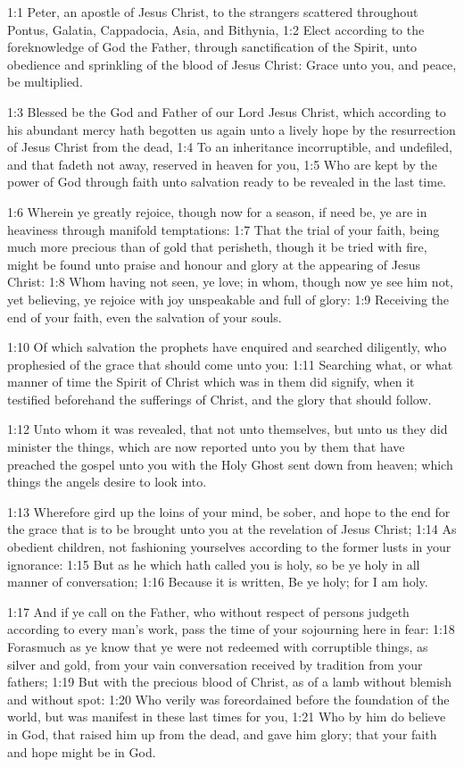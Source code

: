 

1:1 Peter, an apostle of Jesus Christ, to the strangers scattered throughout Pontus, Galatia, Cappadocia, Asia, and Bithynia, 1:2 Elect according to the foreknowledge of God the Father, through sanctification of the Spirit, unto obedience and sprinkling of the blood of Jesus Christ: Grace unto you, and peace, be multiplied.

1:3 Blessed be the God and Father of our Lord Jesus Christ, which according to his abundant mercy hath begotten us again unto a lively hope by the resurrection of Jesus Christ from the dead, 1:4 To an inheritance incorruptible, and undefiled, and that fadeth not away, reserved in heaven for you, 1:5 Who are kept by the power of God through faith unto salvation ready to be revealed in the last time.

1:6 Wherein ye greatly rejoice, though now for a season, if need be, ye are in heaviness through manifold temptations: 1:7 That the trial of your faith, being much more precious than of gold that perisheth, though it be tried with fire, might be found unto praise and honour and glory at the appearing of Jesus Christ: 1:8 Whom having not seen, ye love; in whom, though now ye see him not, yet believing, ye rejoice with joy unspeakable and full of glory: 1:9 Receiving the end of your faith, even the salvation of your souls.

1:10 Of which salvation the prophets have enquired and searched diligently, who prophesied of the grace that should come unto you: 1:11 Searching what, or what manner of time the Spirit of Christ which was in them did signify, when it testified beforehand the sufferings of Christ, and the glory that should follow.

1:12 Unto whom it was revealed, that not unto themselves, but unto us they did minister the things, which are now reported unto you by them that have preached the gospel unto you with the Holy Ghost sent down from heaven; which things the angels desire to look into.

1:13 Wherefore gird up the loins of your mind, be sober, and hope to the end for the grace that is to be brought unto you at the revelation of Jesus Christ; 1:14 As obedient children, not fashioning yourselves according to the former lusts in your ignorance: 1:15 But as he which hath called you is holy, so be ye holy in all manner of conversation; 1:16 Because it is written, Be ye holy; for I am holy.

1:17 And if ye call on the Father, who without respect of persons judgeth according to every man's work, pass the time of your sojourning here in fear: 1:18 Forasmuch as ye know that ye were not redeemed with corruptible things, as silver and gold, from your vain conversation received by tradition from your fathers; 1:19 But with the precious blood of Christ, as of a lamb without blemish and without spot: 1:20 Who verily was foreordained before the foundation of the world, but was manifest in these last times for you, 1:21 Who by him do believe in God, that raised him up from the dead, and gave him glory; that your faith and hope might be in God.

